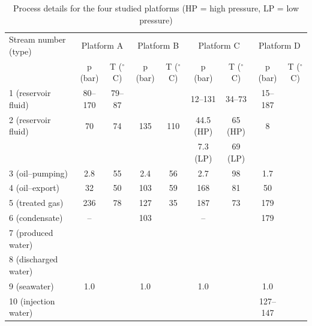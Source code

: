 \documentclass[times,3p]{elsarticle}
\begin{document}
\begin{table}[htbp]
  \centering
  \scriptsize
  \caption{Process details for the four studied platforms (HP = high pressure, LP = low pressure)}
    \begin{tabular*}{\linewidth}{@{\extracolsep{\fill}}lcccccccc}
    \toprule
    Stream number (type)  & \multicolumn{2}{c}{Platform A} & \multicolumn{2}{c}{Platform B} & \multicolumn{2}{c}{Platform C} & \multicolumn{2}{c}{Platform D} \\
     & p (bar) & T ($^{\circ}$C) & p (bar) & T ($^{\circ}$C) & p (bar) & T ($^{\circ}$C) & p (bar) & T ($^{\circ}$C) \\
	 \toprule
	 1 (reservoir fluid)  & 80--170 & 79--87 &       &       & 12--131 & 34--73 & 15--187   &  \\
    2 (reservoir fluid)    & 70    & 74    & 135   & 110   & 44.5 (HP) & 65 (HP) & 8     &  \\
		  &		   & 		  &			&			& 7.3 (LP) & 69 (LP)  & & \\
    3 (oil--pumping)   & 2.8   & 55    & 2.4   & 56    & 2.7   & 98    & 1.7   &  \\
    4 (oil--export)    & 32    & 50    & 103   & 59    & 168   & 81    & 50    &  \\
    5 (treated gas)    & 236   & 78    & 127   & 35    & 187   & 73    & 179   &  \\
    6 (condensate)    &   --    &       &  103     &       &  --     &       & 179      &  \\
    7 (produced water)    &       &       &       &       &       &       &       &  \\
    8 (discharged water)    &       &       &       &       &       &       &       &  \\
    9 (seawater)    & 1.0      &       & 1.0      &       &   1.0    &       & 1.0     &  \\
    10 (injection water)   &       &       &       &       &       &       & 127--147      &  \\
    \bottomrule
    \end{tabular*}%
  \label{tab:process_details}%
\end{table}%

\end{document}
